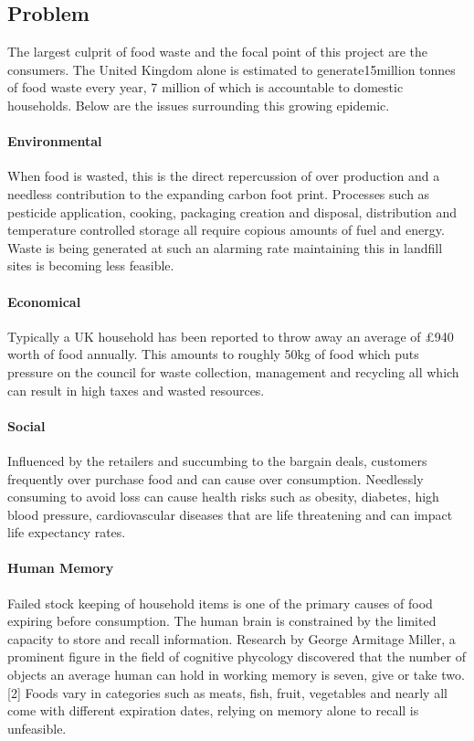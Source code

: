 \documentclass[a4paper, 11pt]{article}
\begin{document}
\subsection{Problem}
The largest culprit of food waste and the focal point of this project are the consumers. The United Kingdom alone is estimated to generate15million tonnes of food waste every year, 7 million of which is accountable to domestic households. Below are the issues surrounding this growing epidemic. 

\paragraph{Environmental}When food is wasted, this is the direct repercussion of over production and a needless contribution to the expanding carbon foot print. Processes such as pesticide application, cooking, packaging creation and disposal, distribution and temperature controlled storage all require copious amounts of fuel and energy. Waste is being generated at such an alarming rate maintaining this in landfill sites is becoming less feasible.

\paragraph{Economical} Typically a UK household has been reported to throw away an average of \pounds940 worth of food annually. This amounts to roughly 50kg of food which puts pressure on the council for waste collection, management and recycling all which can result in high taxes and wasted resources. 

\paragraph{Social} Influenced by the retailers and succumbing to the bargain deals, customers frequently over purchase food and can cause over consumption. Needlessly consuming to avoid loss can cause health risks such as obesity, diabetes, high blood pressure, cardiovascular diseases that are life threatening and can impact life expectancy rates. 

\paragraph{Human Memory} Failed stock keeping of household items is one of the primary causes of food expiring before consumption. The human brain is constrained by the limited capacity to store and recall information. Research by George Armitage Miller, a prominent figure in the field of cognitive phycology discovered that the number of objects an average human can hold in working memory is seven, give or take two.[2] Foods vary in categories such as meats, fish, fruit, vegetables and nearly all come with different expiration dates, relying on memory alone to recall is unfeasible. 
\end{document}
